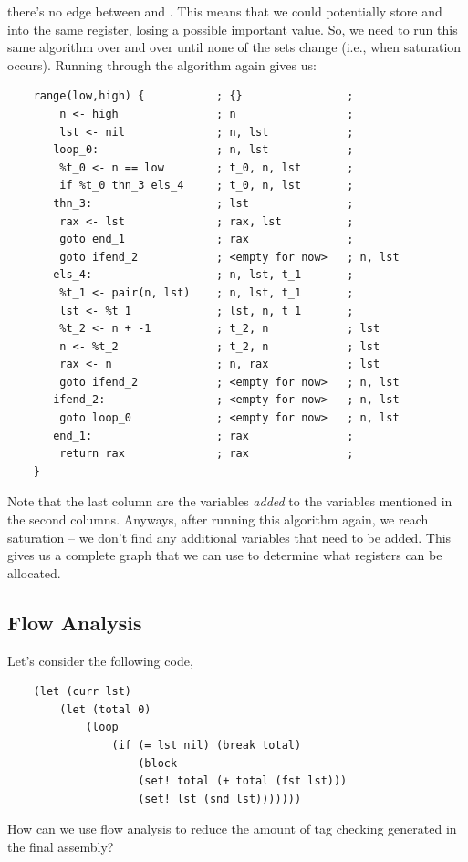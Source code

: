 there's no edge between  and . This means that we could potentially store  and  into the same register, losing a possible important value. So, we need to run this same algorithm over and over until none of the sets change (i.e., when saturation occurs). Running through the algorithm again gives us: 
\begin{verbatim}
    range(low,high) {           ; {}                ; 
        n <- high               ; n                 ; 
        lst <- nil              ; n, lst            ; 
       loop_0:                  ; n, lst            ; 
        %t_0 <- n == low        ; t_0, n, lst       ; 
        if %t_0 thn_3 els_4     ; t_0, n, lst       ; 
       thn_3:                   ; lst               ; 
        rax <- lst              ; rax, lst          ;
        goto end_1              ; rax               ; 
        goto ifend_2            ; <empty for now>   ; n, lst
       els_4:                   ; n, lst, t_1       ; 
        %t_1 <- pair(n, lst)    ; n, lst, t_1       ; 
        lst <- %t_1             ; lst, n, t_1       ; 
        %t_2 <- n + -1          ; t_2, n            ; lst 
        n <- %t_2               ; t_2, n            ; lst 
        rax <- n                ; n, rax            ; lst
        goto ifend_2            ; <empty for now>   ; n, lst
       ifend_2:                 ; <empty for now>   ; n, lst
        goto loop_0             ; <empty for now>   ; n, lst
       end_1:                   ; rax               ; 
        return rax              ; rax               ; 
    }\end{verbatim}
Note that the last column are the variables \emph{added} to the variables mentioned in the second columns. Anyways, after running this algorithm again, we reach saturation -- we don't find any additional variables that need to be added. This gives us a complete graph that we can use to determine what registers can be allocated.

\subsection{Flow Analysis}
Let's consider the following code, 
\begin{verbatim}
    (let (curr lst)
        (let (total 0)
            (loop
                (if (= lst nil) (break total)
                    (block
                    (set! total (+ total (fst lst)))
                    (set! lst (snd lst)))))))\end{verbatim}
How can we use flow analysis to reduce the amount of tag checking generated in the final assembly?

